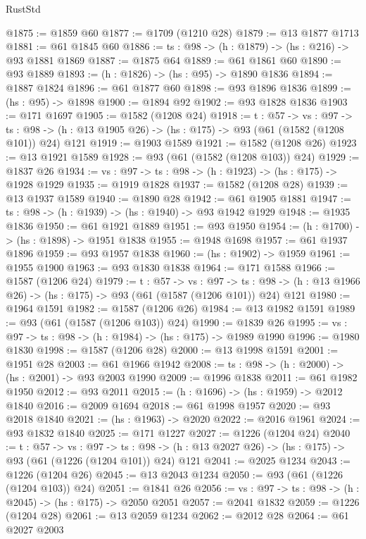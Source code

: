 \begin{lexlean}{RustStd}
\begin{coremodule}
@1875 := @1859 @60
@1877 := @1709 (@1210 @28)
@1879 := @13 @1877 @1713
@1881 := @61 @1845 @60
@1886 := {ts : @98} -> (h : @1879) -> (hs : @216) -> @93 @1881 @1869
@1887 := @1875 @64
@1889 := @61 @1861 @60
@1890 := @93 @1889
@1893 := (h : @1826) -> (hs : @95) -> @1890 @1836
@1894 := @1887 @1824
@1896 := @61 @1877 @60
@1898 := @93 @1896 @1836
@1899 := (hs : @95) -> @1898
@1900 := @1894 @92
@1902 := @93 @1828 @1836
@1903 := @171 @1697
@1905 := @1582 (@1208 @24)
@1918 := {t : @57} ->
  {vs : @97} ->
  {ts : @98} -> (h : @13 @1905 @26) -> (hs : @175) -> @93 (@61 (@1582 (@1208 @101)) @24) @121
@1919 := @1903 @1589
@1921 := @1582 (@1208 @26)
@1923 := @13 @1921 @1589
@1928 := @93 (@61 (@1582 (@1208 @103)) @24)
@1929 := @1837 @26
@1934 := {vs : @97} -> {ts : @98} -> (h : @1923) -> (hs : @175) -> @1928 @1929
@1935 := @1919 @1828
@1937 := @1582 (@1208 @28)
@1939 := @13 @1937 @1589
@1940 := @1890 @28
@1942 := @61 @1905 @1881
@1947 := {ts : @98} -> (h : @1939) -> (hs : @1940) -> @93 @1942 @1929
@1948 := @1935 @1836
@1950 := @61 @1921 @1889
@1951 := @93 @1950
@1954 := (h : @1700) -> (hs : @1898) -> @1951 @1838
@1955 := @1948 @1698
@1957 := @61 @1937 @1896
@1959 := @93 @1957 @1838
@1960 := (hs : @1902) -> @1959
@1961 := @1955 @1900
@1963 := @93 @1830 @1838
@1964 := @171 @1588
@1966 := @1587 (@1206 @24)
@1979 := {t : @57} ->
  {vs : @97} ->
  {ts : @98} -> (h : @13 @1966 @26) -> (hs : @175) -> @93 (@61 (@1587 (@1206 @101)) @24) @121
@1980 := @1964 @1591
@1982 := @1587 (@1206 @26)
@1984 := @13 @1982 @1591
@1989 := @93 (@61 (@1587 (@1206 @103)) @24)
@1990 := @1839 @26
@1995 := {vs : @97} -> {ts : @98} -> (h : @1984) -> (hs : @175) -> @1989 @1990
@1996 := @1980 @1830
@1998 := @1587 (@1206 @28)
@2000 := @13 @1998 @1591
@2001 := @1951 @28
@2003 := @61 @1966 @1942
@2008 := {ts : @98} -> (h : @2000) -> (hs : @2001) -> @93 @2003 @1990
@2009 := @1996 @1838
@2011 := @61 @1982 @1950
@2012 := @93 @2011
@2015 := (h : @1696) -> (hs : @1959) -> @2012 @1840
@2016 := @2009 @1694
@2018 := @61 @1998 @1957
@2020 := @93 @2018 @1840
@2021 := (hs : @1963) -> @2020
@2022 := @2016 @1961
@2024 := @93 @1832 @1840
@2025 := @171 @1227
@2027 := @1226 (@1204 @24)
@2040 := {t : @57} ->
  {vs : @97} ->
  {ts : @98} -> (h : @13 @2027 @26) -> (hs : @175) -> @93 (@61 (@1226 (@1204 @101)) @24) @121
@2041 := @2025 @1234
@2043 := @1226 (@1204 @26)
@2045 := @13 @2043 @1234
@2050 := @93 (@61 (@1226 (@1204 @103)) @24)
@2051 := @1841 @26
@2056 := {vs : @97} -> {ts : @98} -> (h : @2045) -> (hs : @175) -> @2050 @2051
@2057 := @2041 @1832
@2059 := @1226 (@1204 @28)
@2061 := @13 @2059 @1234
@2062 := @2012 @28
@2064 := @61 @2027 @2003

\end{coremodule}
\end{lexlean}
